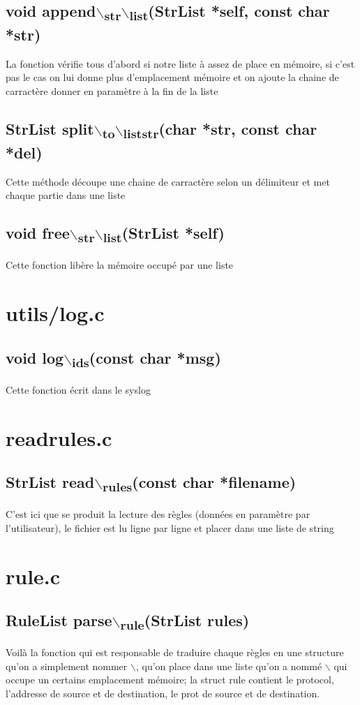 \documentclass[a4paper]{report}
\begin{document}
\section{void append$\backslash$\textsubscript{str}$\backslash$\textsubscript{list}(StrList *self, const char *str)}
\label{sec:orgb3a0d2a}
La fonction vérifie tous d'abord si notre liste à assez de place en mémoire, si c'est pas le cas on lui donne plus d'emplacement mémoire
et on ajoute la chaine de carractère donner en paramètre à la fin de la liste
\section{StrList split$\backslash$\textsubscript{to}$\backslash$\textsubscript{liststr}(char *str, const char *del)}
\label{sec:org2308a95}
Cette méthode découpe une chaine de carractère selon un délimiteur et met chaque partie dans une liste
\section{void free$\backslash$\textsubscript{str}$\backslash$\textsubscript{list}(StrList *self)}
\label{sec:orgbc482fd}
Cette fonction libère la mémoire occupé par une liste
\chapter{utils/log.c}
\label{sec:org67d35bf}
\section{void log$\backslash$\textsubscript{ids}(const char *msg)}
\label{sec:orge8bfb0d}
Cette fonction écrit dans le syslog
\chapter{readrules.c}
\label{sec:org7b1e435}
\section{StrList read$\backslash$\textsubscript{rules}(const char *filename)}
\label{sec:org5357080}
C'est ici que se produit la lecture des règles (données en paramètre par l'utilisateur), le fichier est lu ligne par ligne et 
placer dans une liste de string
\chapter{rule.c}
\label{sec:orge5979b1}
\section{RuleList parse$\backslash$\textsubscript{rule}(StrList rules)}
\label{sec:orga5d41d9}
Voilà la fonction qui est responsable de traduire chaque règles en une structure qu'on a simplement nommer \Rule$\backslash$, qu'on place dans une liste
qu'on a nommé \RuleList$\backslash$ qui occupe un certains emplacement mémoire; la struct rule contient le protocol, l'addresse de source et de destination, le prot de source et de destination. 
\end{document}
